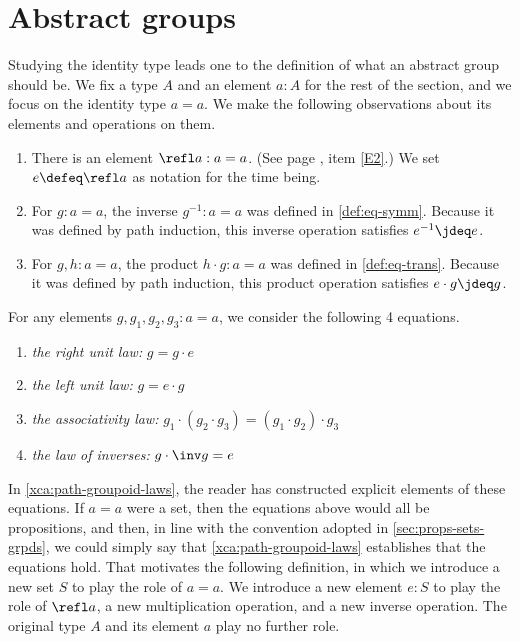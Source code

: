 \section{Abstract groups}
\label{sec:identity-type-as-abstract}

Studying the identity type leads one to the definition of what an abstract group should be.  We fix a type $A$ and an element $a:A$ for the rest
of the section, and we focus on the identity type $a=a$.  We make the following observations about its elements and operations on them.

\begin{enumerate}
\item
  There is an element $\refl a : a=a$.
  (See page \pageref{rules-for-equality}, item \ref{E2}.)
  We set $e \defeq \refl a$ as notation for the time being.
\item
  For $g : a=a$, the inverse $g^{-1} : a=a$ was defined in \cref{def:eq-symm}.
  Because it was defined by path induction, this inverse operation satisfies $e^{-1} \jdeq e$.
\item
  For $g, h : a=a$, the product $h \cdot g : a=a$ was defined in \cref{def:eq-trans}.
  Because it was defined by path induction, this product operation satisfies $e \cdot g \jdeq g$.
\end{enumerate}

For any elements $g,g_1,g_2,g_3:a=a$, we consider the following 4 equations.
\begin{enumerate}
\item
  \label{it:right-unit} \emph{the right unit law:} $g=g\cdot e$
\item
  \label{it:left-unit} \emph{the left unit law:} $g=e\cdot g$
\item
  \label{it:associativity} \emph{the associativity law:} $g_1\cdot(g_2\cdot g_3)=(g_1\cdot g_2)\cdot g_3$
\item
  \label{it:inverse} \emph{the law of inverses:} $g\cdot \inv g = e$
\end{enumerate}

In \cref{xca:path-groupoid-laws}, the reader has constructed explicit elements of these equations.  If $a=a$ were a set, then the equations
above would all be propositions, and then, in line with the convention adopted in \cref{sec:props-sets-grpds}, we could simply say that
\cref{xca:path-groupoid-laws} establishes that the equations hold.  That motivates the following definition, in which we introduce a new set $S$
to play the role of $a=a$.  We introduce a new element $e:S$ to play the role of $\refl a$, a new multiplication operation, and a new inverse
operation.  The original type $A$ and its element $a$ play no further role.

